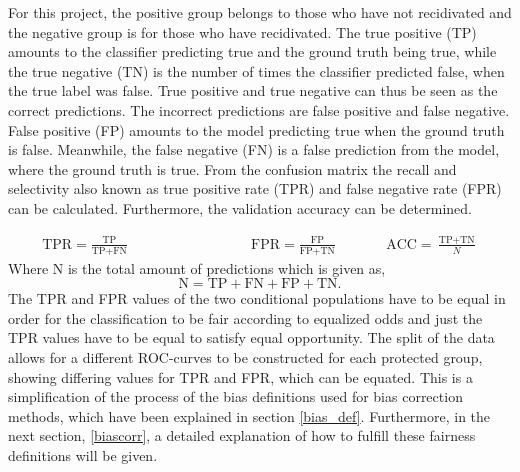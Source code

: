 \documentclass[11pt, fleqn, titlepage]{article}
\begin{document}
	\noindent
	For this project, the positive group belongs to those who have not recidivated and the negative group is for those who have recidivated. The true positive (TP) amounts to the classifier predicting true and the ground truth being true, while the true negative (TN) is the number of times the classifier predicted false, when the true label was false. True positive and true negative can thus be seen as the correct predictions. The incorrect predictions are false positive and false negative. False positive (FP) amounts to the model predicting true when the ground truth is false. Meanwhile, the false negative (FN) is a false prediction from the model, where the ground truth is true. From the confusion matrix the recall and selectivity also known as true positive rate (TPR) and false negative rate (FPR) can be calculated. Furthermore, the validation accuracy can be determined.
	
	\begin{align}\label{tpr_fpr_acc}
	\text{TPR} = \frac{\text{TP}}{\text{TP}+\text{FN}}\qquad \qquad \qquad \qquad &
	\text{FPR} = \frac{\text{FP}}{\text{FP}+\text{TN}} \qquad &&
	\text{ACC} = \frac{\text{TP}+\text{TN}}{N}
	\end{align} \noindent
	Where N is the total amount of predictions which is given as, 
	\[\text{N} = \text{TP}+\text{FN}+\text{FP}+\text{TN.}\] 
	The TPR and FPR values of the two conditional populations have to be equal in order for the classification to be fair according to equalized odds and just the TPR values have to be equal to satisfy equal opportunity. The split of the data allows for a different ROC-curves to be constructed for each protected group, showing differing values for TPR and FPR, which can be equated. This is a simplification of the process of the bias definitions used for bias correction methods, which have been explained in section \ref{bias_def}. Furthermore, in the next section, \ref{biascorr}, a detailed explanation of how to fulfill these fairness definitions will be given. 
	
\end{document}
